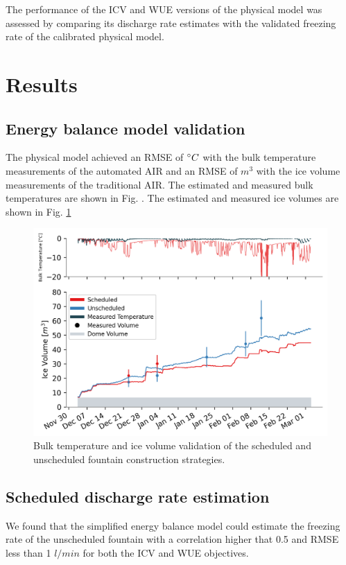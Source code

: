 \documentclass[tc, manuscript]{copernicus}
\begin{document}
The performance of the ICV and WUE versions of the physical model was assessed by comparing its discharge rate
estimates with the validated freezing rate of the calibrated physical model.

\section{Results}

\subsection{Energy balance model validation}
The physical model achieved an RMSE of $^{\circ} C$ with the bulk temperature measurements of the automated AIR
and an RMSE of $m^3$ with the ice volume measurements of the traditional AIR. The estimated and measured bulk
temperatures are shown in Fig. . The estimated and measured ice volumes are shown in Fig. \ref{fig:iceV}
 
\begin{figure}[t]
\includegraphics[width=12cm]{Figures/validation.png}
\caption{Bulk temperature and ice volume validation of the scheduled and unscheduled fountain construction
strategies.}
\label{fig:iceV}
\end{figure}

\subsection{Scheduled discharge rate estimation}

We found that the simplified energy balance model could estimate the freezing rate of the unscheduled fountain with a
correlation higher that 0.5 and RMSE less than 1 $l/min$ for both the ICV and WUE objectives.
\end{document}
